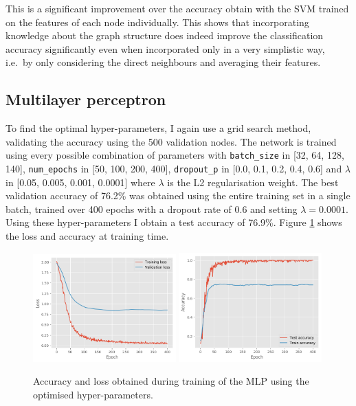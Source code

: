 \documentclass[12pt]{article}
\theoremstyle{definition}
\begin{document}
This is a significant improvement over the accuracy obtain with the SVM trained on the features of each node individually. This shows that incorporating knowledge about the graph structure does indeed improve the classification accuracy significantly even when incorporated only in a very simplistic way, i.e.\ by only considering the direct neighbours and averaging their features.

\subsection{Multilayer perceptron}
To find the optimal hyper-parameters, I again use a grid search method, validating the accuracy using the 500 validation nodes. The network is trained using every possible combination of parameters with \texttt{batch\_size} in [32, 64, 128, 140], \texttt{num\_epochs} in  [50, 100, 200, 400], \texttt{dropout\_p} in  [0.0, 0.1, 0.2, 0.4, 0.6] and $\lambda$ in  [0.05, 0.005, 0.001, 0.0001] where $\lambda$ is the L2 regularisation weight. The best validation accuracy of 76.2\% was obtained using the entire training set in a single batch, trained over 400 epochs with a dropout rate of 0.6 and setting $\lambda = 0.0001$. Using these hyper-parameters I obtain a test accuracy of 76.9\%. Figure \ref{fig/mlp_training} shows the loss and accuracy at training time.
\begin{figure}[h]
	\includegraphics[width=0.49\textwidth]{mlp/loss}
	\includegraphics[width=0.49\textwidth]{mlp/acc}
	\centering
	\caption{Accuracy and loss obtained during training of the MLP using the optimised hyper-parameters.}
	\label{fig/mlp_training}
\end{figure}
\end{document}
